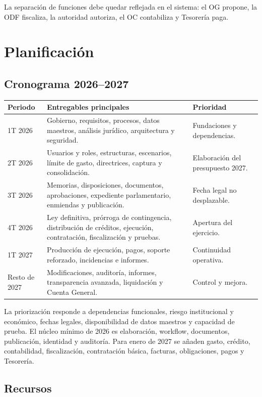 \documentclass[11pt,a4paper]{article}
\begin{document}
La separación de funciones debe quedar reflejada en el sistema: el OG propone, la ODF fiscaliza, la autoridad autoriza, el OC contabiliza y Tesorería paga.

\section{Planificación}

\subsection{Cronograma 2026--2027}
\begin{center}
\begin{tabularx}{0.95\textwidth}{l Y Y}
\toprule
\textbf{Periodo} & \textbf{Entregables principales} & \textbf{Prioridad}\\
\midrule
1T 2026 & Gobierno, requisitos, procesos, datos maestros, análisis jurídico, arquitectura y seguridad. & Fundaciones y dependencias.\\
2T 2026 & Usuarios y roles, estructuras, escenarios, límite de gasto, directrices, captura y consolidación. & Elaboración del presupuesto 2027.\\
3T 2026 & Memorias, disposiciones, documentos, aprobaciones, expediente parlamentario, enmiendas y publicación. & Fecha legal no desplazable.\\
4T 2026 & Ley definitiva, prórroga de contingencia, distribución de créditos, ejecución, contratación, fiscalización y pruebas. & Apertura del ejercicio.\\
1T 2027 & Producción de ejecución, pagos, soporte reforzado, incidencias e informes. & Continuidad operativa.\\
Resto de 2027 & Modificaciones, auditoría, informes, transparencia avanzada, liquidación y Cuenta General. & Control y mejora.\\
\bottomrule
\end{tabularx}
\end{center}

La priorización responde a dependencias funcionales, riesgo institucional y económico, fechas legales, disponibilidad de datos maestros y capacidad de prueba. El núcleo mínimo de 2026 es elaboración, workflow, documentos, publicación, identidad y auditoría. Para enero de 2027 se añaden gasto, crédito, contabilidad, fiscalización, contratación básica, facturas, obligaciones, pagos y Tesorería.

\subsection{Recursos}
\end{document}
